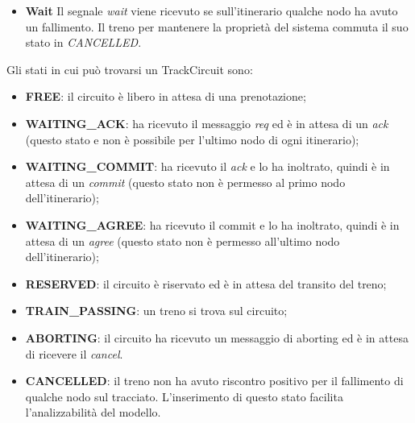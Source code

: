 \begin{itemize}
\item \textbf{Wait} Il segnale \textit{wait} viene ricevuto se sull'itinerario qualche
nodo ha avuto un fallimento. Il treno per mantenere la proprietà del
sistema commuta il suo stato in \textit{CANCELLED}.
\end{itemize}

Gli stati in cui può trovarsi un TrackCircuit sono:
\begin{itemize}
  \item \textbf{FREE}: il circuito è libero in attesa di una prenotazione;
  \item \textbf{WAITING\_ACK}: ha ricevuto il messaggio \textit{req} ed è in
  attesa di un \textit{ack} (questo stato e non è possibile per l’ultimo nodo di ogni
  itinerario);
  \item \textbf{WAITING\_COMMIT}: ha ricevuto il \textit{ack} e lo ha inoltrato,
  quindi è in attesa di un \textit{commit} (questo stato non è permesso al primo
  nodo dell’itinerario);
  \item \textbf{WAITING\_AGREE}: ha ricevuto il commit e lo ha inoltrato, quindi
  è in attesa di un \textit{agree} (questo stato non è permesso all’ultimo nodo
  dell’itinerario);
  \item \textbf{RESERVED}: il circuito è riservato ed è in attesa del transito
  del treno;
  \item \textbf{TRAIN\_PASSING}: un treno si trova sul circuito;
  \item \textbf{ABORTING}: il circuito ha ricevuto un messaggio di aborting ed è
  in attesa di ricevere il \textit{cancel}.
  \item \textbf{CANCELLED}: il treno non ha avuto riscontro positivo per il
  fallimento di qualche nodo sul tracciato. L'inserimento di questo stato
  facilita l'analizzabilità del modello. 
\end{itemize}

